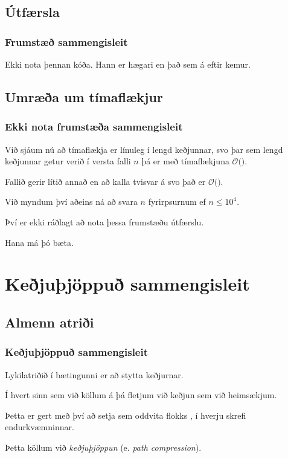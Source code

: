 \subsection{Útfærsla}
{
    \frametitle{Frumstæð sammengisleit}
    {
        \item<0|handout:1> { Ekki nota þennan kóða. Hann er hægari en það sem á eftir kemur. }
    }
}

\subsection{Umræða um tímaflækjur}
{
    \frametitle{Ekki nota frumstæða sammengisleit}
    {
        \item<1-> Við sjáum nú að tímaflækja  er línuleg í lengd keðjunnar, svo 
            þar sem lengd keðjunnar getur verið í versta falli $n$ þá er  með tímaflækjuna $\mathcal{O}($$)$.
        \item<3-> Fallið  gerir lítið annað en að kalla tvisvar á  svo það er $\mathcal{O}($$)$.
        \item<5-> Við myndum því aðeins ná að svara $n$ fyrirpsurnum ef $n \leq 10^4$.
        \item<6-> Því er ekki ráðlagt að nota þessa frumstæðu útfærslu.
        \item<7-> Hana má þó bæta.
    }
}

\section{Keðjuþjöppuð sammengisleit}
\subsection{Almenn atriði}
{
    \frametitle{Keðjuþjöppuð sammengisleit}
    {
        \item<1-> Lykilatriðið í bætingunni er að stytta keðjurnar.
        \item<2-> Í hvert sinn sem við köllum á  þá fletjum við keðjun sem við heimsækjum.
        \item<3-> Þetta er gert með því að setja  sem oddvita flokks , í hverju skrefi endurkvæmninnar.
        \item<4-> Þetta köllum við \emph{keðjuþjöppun} (e. \emph{path compression}).
    }
}

